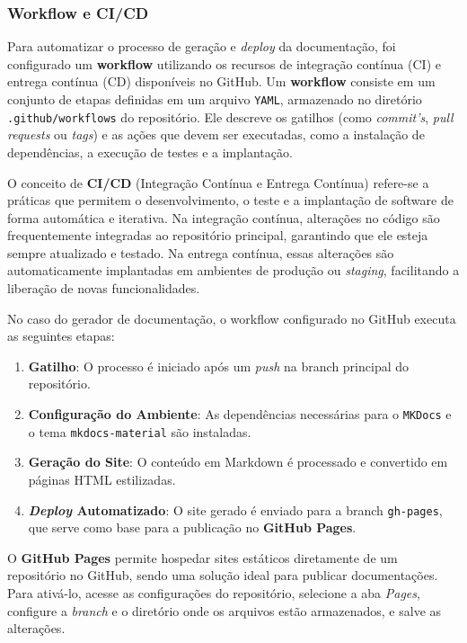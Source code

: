 \subsubsection{Workflow e CI/CD}

Para automatizar o processo de geração e \textit{deploy} da documentação, foi configurado um \textbf{workflow} utilizando os recursos de integração contínua (CI) e entrega contínua (CD) disponíveis no GitHub. Um \textbf{workflow} consiste em um conjunto de etapas definidas em um arquivo \texttt{YAML}, armazenado no diretório \texttt{.github/workflows} do repositório. Ele descreve os gatilhos (como \textit{commit's}, \textit{pull requests} ou \textit{tags}) e as ações que devem ser executadas, como a instalação de dependências, a execução de testes e a implantação.

O conceito de \textbf{CI/CD} (Integração Contínua e Entrega Contínua) refere-se a práticas que permitem o desenvolvimento, o teste e a implantação de software de forma automática e iterativa. Na integração contínua, alterações no código são frequentemente integradas ao repositório principal, garantindo que ele esteja sempre atualizado e testado. Na entrega contínua, essas alterações são automaticamente implantadas em ambientes de produção ou \textit{staging}, facilitando a liberação de novas funcionalidades.

No caso do gerador de documentação, o workflow configurado no GitHub executa as seguintes etapas:

\begin {enumerate}
    \item \textbf{Gatilho}: O processo é iniciado após um \textit{push} na branch principal do repositório.
    \item \textbf{Configuração do Ambiente}: As dependências necessárias para o \texttt{MKDocs} e o tema \texttt{mkdocs-material} são instaladas.
    \item \textbf{Geração do Site}: O conteúdo em Markdown é processado e convertido em páginas HTML estilizadas.
    \item \textbf{\textit{Deploy} Automatizado}: O site gerado é enviado para a branch \texttt{gh-pages}, que serve como base para a publicação no \textbf{GitHub Pages}.
\end {enumerate}

O \textbf{GitHub Pages} permite hospedar sites estáticos diretamente de um repositório no GitHub, sendo uma solução ideal para publicar documentações. Para ativá-lo, acesse as configurações do repositório, selecione a aba \textit{Pages}, configure a \textit{branch} e o diretório onde os arquivos estão armazenados, e salve as alterações.

